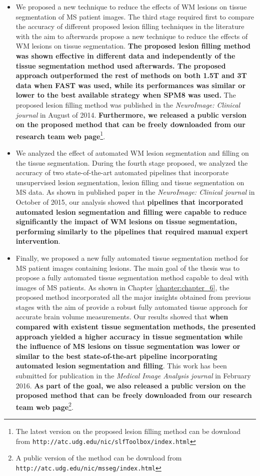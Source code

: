 \begin{itemize}
\item We proposed a new technique to reduce the effects of WM lesions on tissue segmentation of MS patient images. The third stage required first to compare the accuracy of different proposed lesion filling techniques in the literature with the aim to afterwards propose a new technique to reduce the effects of WM lesions on tissue segmentation. \textbf{The proposed lesion filling method was shown effective in different data and independently of the tissue segmentation method used afterwards. The proposed approach outperformed the rest of methods on both 1.5T and 3T data when FAST was used, while its performances was similar or lower to the best available strategy when SPM8 was used.} The proposed lesion filling method was  published in the\textit{ NeuroImage: Clinical journal} in August of 2014. \textbf{Furthermore, we released a public version on the proposed method that can be freely downloaded from our research team web page}\footnote{The latest version on the proposed lesion filling method can be download from \texttt{http://atc.udg.edu/nic/slfToolbox/index.html}}.

\item We analyzed the effect of automated WM lesion segmentation and filling on the tissue segmentation. During the fourth stage proposed, we analyzed the accuracy of two state-of-the-art automated pipelines that incorporate unsupervised lesion segmentation, lesion filling and tissue segmentation on MS data.  As shown in published paper in the \textit{NeuroImage: Clinical journal} in October of 2015, our analysis showed that \textbf{pipelines that incorporated automated lesion segmentation and filling were capable to reduce significantly the impact of WM lesions on tissue segmentation, performing similarly to the pipelines that required manual expert intervention}.


\item Finally, we proposed a new fully automated tissue segmentation method for MS patient images containing lesions. The main goal of the thesis was to propose a fully automated tissue segmentation method capable to deal with images of MS patients. As shown in Chapter \ref{chapter:chapter_6}, the proposed method incorporated all the major insights obtained from previous stages with the aim of provide a robust fully automated tissue approach for accurate brain volume measurements. Our results showed that  \textbf{when compared with existent tissue segmentation methods, the presented approach yielded a higher accuracy in tissue segmentation while the influence of MS lesions on tissue segmentation was lower or similar to the best state-of-the-art pipeline incorporating automated lesion segmentation and filling}. This work has been submitted for publication in the\textit{ Medical Image Analysis journal }in February 2016. \textbf{As part of the goal, we also released a public version on the proposed method that can be freely downloaded from our research team web page}\footnote{A public version of the method can be download from \texttt{http://atc.udg.edu/nic/msseg/index.html}}.

\end{itemize}


